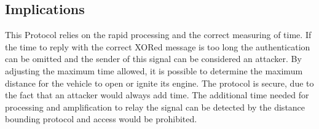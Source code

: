 \subsection{Implications}
	\label{sec:DBimp}
	This Protocol relies on the rapid processing and the correct measuring of time.
	If the time to reply with the correct XORed message is too long the authentication
	can be omitted and the sender of this signal can be considered an attacker.
	By adjusting the maximum time allowed,
	it is possible to determine the maximum distance for the vehicle to open
	or ignite its engine.
	The protocol is secure,
	due to the fact that an attacker would always add time.
	The additional time needed for processing and amplification 
	to relay the signal can be detected by the distance bounding protocol
	and access would be prohibited.
	
	
	
